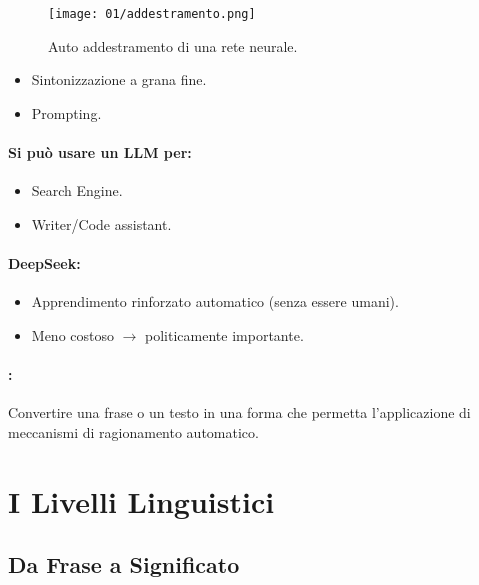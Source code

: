 \begin{figure}[h]
    \centering
    \texttt{[image: 01/addestramento.png]}
    \caption{Auto addestramento di una rete neurale.}
\end{figure}


\begin{itemize}
  \item Sintonizzazione a grana fine.
  \item Prompting.
\end{itemize}

\paragraph{Si può usare un LLM per:}

\begin{itemize}
  \item Search Engine. 
  \item Writer/Code assistant.
\end{itemize}


\paragraph{DeepSeek:}

\begin{itemize}
  \item Apprendimento rinforzato automatico (senza essere umani). 
  \item Meno costoso $\rightarrow$ politicamente importante.
\end{itemize}

\paragraph{:} Convertire una frase o un testo in una forma che
permetta l'applicazione di meccanismi di
ragionamento automatico.

\section{I Livelli Linguistici}

\subsection{Da Frase a Significato}

